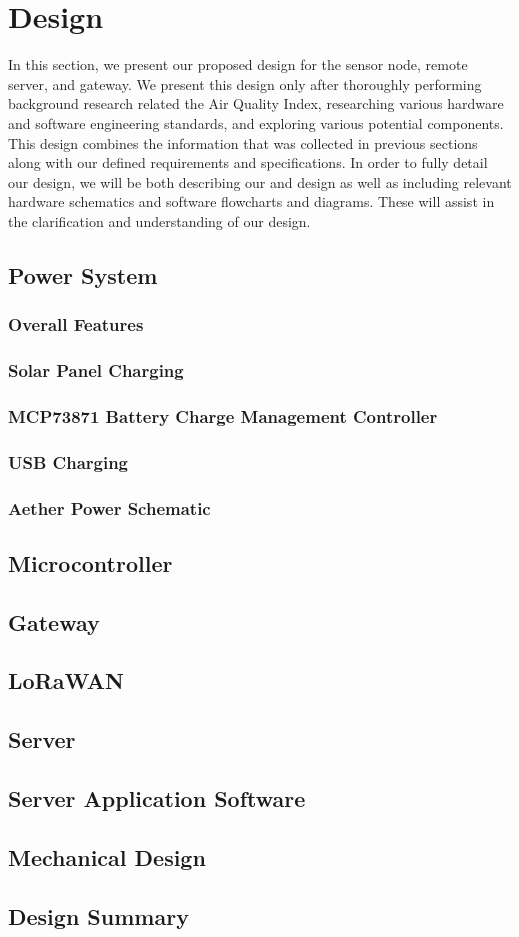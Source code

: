 \section{Design}
In this section, we present our proposed design for the sensor node, remote server, and gateway. We present this design only after thoroughly performing background research related the Air Quality Index, researching various hardware and software engineering standards, and exploring various potential components. This design combines the information that was collected in previous sections along with our defined requirements and specifications. In order to fully detail our design, we will be both describing our and design as well as including relevant hardware schematics and software flowcharts and diagrams. These will assist in the clarification and understanding of our design.

\subsection{Power System}
\subsubsection{Overall Features}
\subsubsection{Solar Panel Charging}
\subsubsection{MCP73871 Battery Charge Management Controller}
\subsubsection{USB Charging}
\subsubsection{Aether Power Schematic}
\subsection{Microcontroller}
\subsection{Gateway}
\subsection{LoRaWAN}
\subsection{Server}



\subsection{Server Application Software}
\subsection{Mechanical Design}
\subsection{Design Summary}


